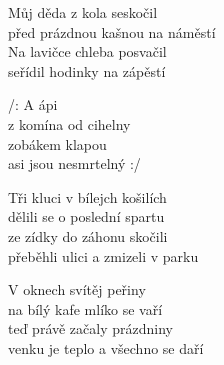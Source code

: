 
\ve{}
Můj děda z kola seskočil\\
před prázdnou kašnou na náměstí\\
Na lavičce chleba posvačil\\
seřídil hodinky na zápěstí

\cho{}
/: A ápi\\
z komína od cihelny\\
zobákem klapou\\
asi jsou nesmrtelný :/

\ve{}
Tři kluci v bílejch košilích\\
dělili se o poslední spartu\\
ze zídky do záhonu skočili\\
přeběhli ulici a zmizeli v parku

\cho{}

\ve{}
V oknech svítěj peřiny\\
na bílý kafe mlíko se vaří\\
teď právě začaly prázdniny\\
venku je teplo a všechno se daří

\cho{}

\esong